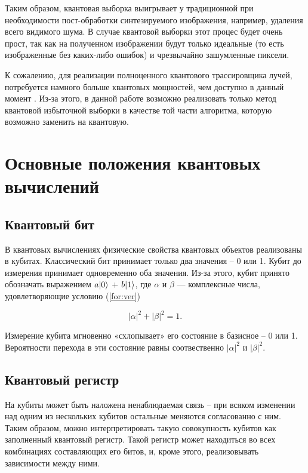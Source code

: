  Таким образом, квантовая выборка выигрывает у традиционной при необходимости пост-обработки синтезируемого изображения, например, удаления всего видимого шума. В случае квантовой выборки этот процес будет очень прост, так как на полученном изображении будут только идеальные (то есть изображенные без каких-либо ошибок) и чрезвычайно зашумленные пиксели. 

К сожалению, для реализации полноценного квантового трассировщика лучей, потребуется намного больше квантовых мощностей, чем доступно в данный момент \cite{PQC}. Из-за этого, в данной работе возможно реализовать только метод квантовой избыточной выборки в качестве той части алгоритма, которую возможно заменить на квантовую.

\section{Основные положения квантовых вычислений}

\subsection{Квантовый бит}

В квантовых вычислениях физические свойства квантовых объектов реализованы в кубитах. Классический бит принимает только два значения – 0 или 1. Кубит до измерения принимает одновременно оба значения. Из-за этого, кубит принято обозначать выражением $a\lvert0\rangle$ + $b\lvert1\rangle$, где $\alpha$ и $\beta$ — комплексные числа, удовлетворяющие условию (\ref{for:ver})

\begin{equation}
\label{for:ver}
|\alpha|^2 + |\beta|^2 = 1. 
\end{equation} 

Измерение кубита мгновенно «схлопывает»  его состояние в базисное – 0 или 1. Вероятности перехода в эти состояние равны соотвественно $|\alpha|^2$ и $|\beta|^2$. 

\subsection{Квантовый регистр}

На кубиты может быть наложена ненаблюдаемая связь -- при всяком изменении над одним из нескольких кубитов остальные меняются согласованно с ним. Таким образом, можно интерпретировать такую совокупность кубитов как заполненный квантовый регистр. Такой регистр может находиться во всех комбинациях составляющих его битов, и, кроме этого, реализовывать зависимости между ними.


